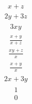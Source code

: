 \documentclass{article}
\begin{document}
\begin{align*}
x_{} + z_{}\end{align*}
\begin{align*}
2y_{} + 3z_{}\end{align*}
\begin{align*}
3x_{}y_{}\end{align*}
\begin{align*}
\frac{x_{} + y_{}}{x_{} + z_{}}\end{align*}
\begin{align*}
\frac{x_{}y_{} + z_{}}{x_{}}\end{align*}
\begin{align*}
\frac{x_{} + y_{}}{x_{}}\end{align*}
\begin{align*}
2x_{} + 3y_{}\end{align*}
\begin{align*}
1\end{align*}
\begin{align*}
0\end{align*}
\end{document}
